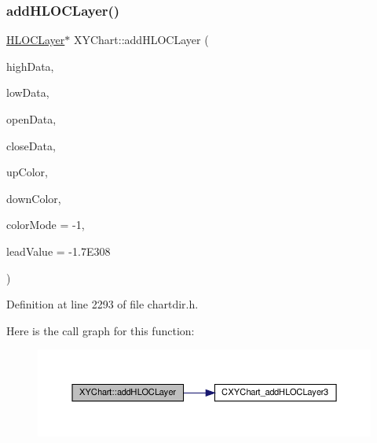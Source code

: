 \subsubsection{\texorpdfstring{add\+H\+L\+O\+C\+Layer()}{addHLOCLayer()}\hspace{0.1cm}{\footnotesize\ttfamily [4/4]}}
{\footnotesize\ttfamily \hyperlink{class_h_l_o_c_layer}{H\+L\+O\+C\+Layer}$\ast$ X\+Y\+Chart\+::add\+H\+L\+O\+C\+Layer (\begin{DoxyParamCaption}\item[{\hyperlink{class_double_array}{Double\+Array}}]{high\+Data,  }\item[{\hyperlink{class_double_array}{Double\+Array}}]{low\+Data,  }\item[{\hyperlink{class_double_array}{Double\+Array}}]{open\+Data,  }\item[{\hyperlink{class_double_array}{Double\+Array}}]{close\+Data,  }\item[{int}]{up\+Color,  }\item[{int}]{down\+Color,  }\item[{int}]{color\+Mode = {\ttfamily -\/1},  }\item[{double}]{lead\+Value = {\ttfamily -\/1.7E308} }\end{DoxyParamCaption})\hspace{0.3cm}{\ttfamily [inline]}}



Definition at line 2293 of file chartdir.\+h.

Here is the call graph for this function\+:
\nopagebreak
\begin{figure}[H]
\begin{center}
\leavevmode
\includegraphics[width=350pt]{class_x_y_chart_a40850db454a426061148872d99ba382e_cgraph}
\end{center}
\end{figure}
\mbox{\label{class_x_y_chart_ae674c8d52d32574672d845c5f154f9d3}} 
